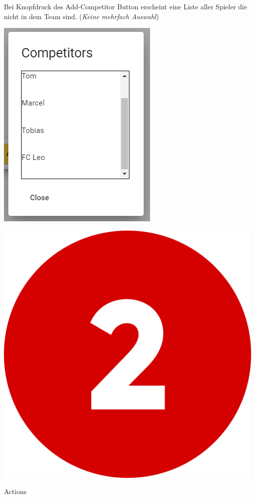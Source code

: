 Bei Knopfdruck des Add-Competitor Button erscheint eine Liste aller Spieler die nicht in dem Team sind.
(\textit{Keine mehrfach Auswahl})

\includegraphics[scale=0.4]{pics/user-guide/add-competitor.PNG}

\includegraphics[scale=0.05]{pics/user-guide/numbers/number-2.png} \begin{LARGE} Actions \end{LARGE}

